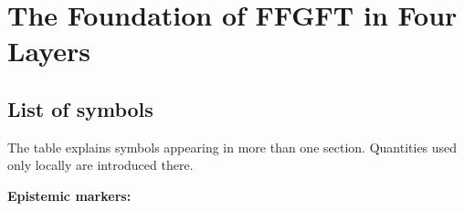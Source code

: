
\providecommand{\BM}{\textbf{[B]}}
\providecommand{\KM}{\textbf{[K]}}
\providecommand{\SM}{\textbf{[S]}}
\providecommand{\SetzM}{\textbf{[SETZUNG]}}
\providecommand{\QM}{\textbf{[Q]}}
\providecommand{\EM}{\textbf{[E]}}
\providecommand{\XM}{\textbf{[X]}}

\chapter*{The Foundation of FFGFT in Four Layers}

\begin{abstract}
FFGFT rests on four layers of different epistemic character. Layer~1 (the
fundamental equation and the principle of relativity) and Layer~2 (the
electromagnetic sector with $\alpha=1$) are parameter-free in natural units
and generate the structure. Layer~3 ($\xi$ as scaling parameter) translates
the structure into measurable quantities; it is the only free parameter.
Layer~4 (algebraic confirmations: Galois fields, Hodge theory, representation
theory) demonstrates the coherence of the system against known mathematics but
adds no new inputs. Translation into SI units and comparison with the Standard
Model are communication work for established systems, not structural inputs.
The cosmic sector ($H_0/\Lambda$) is bracketed because the Standard Model
derives it equally little.
\end{abstract}

\section*{List of symbols}

The table explains symbols appearing in more than one section.
Quantities used only locally are introduced there.

\medskip
\textbf{Epistemic markers:}\par



